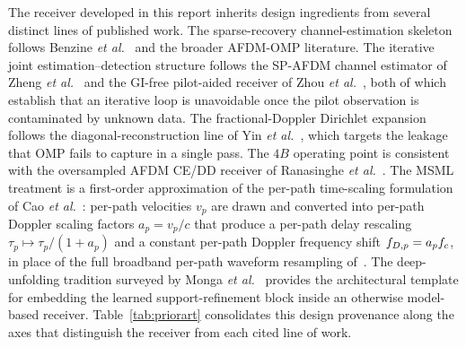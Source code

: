 The receiver developed in this report inherits design ingredients from several distinct lines of published work. The sparse-recovery channel-estimation skeleton follows Benzine \emph{et al.}~\cite{benzine2023sparseafdm} and the broader AFDM-OMP literature. The iterative joint estimation--detection structure follows the SP-AFDM channel estimator of Zheng \emph{et al.}~\cite{qing2024spafdm} and the GI-free pilot-aided receiver of Zhou \emph{et al.}~\cite{zhao2024gifreeafdm}, both of which establish that an iterative loop is unavoidable once the pilot observation is contaminated by unknown data. The fractional-Doppler Dirichlet expansion follows the diagonal-reconstruction line of Yin \emph{et al.}~\cite{yin2024drceafdm}, which targets the leakage that OMP fails to capture in a single pass. The $4B$ operating point is consistent with the oversampled AFDM CE/DD receiver of Ranasinghe \emph{et al.}~\cite{ma2024oversampledafdm}. The MSML treatment is a first-order approximation of the per-path time-scaling formulation of Cao \emph{et al.}~\cite{zhou2024msmlafdm}: per-path velocities $v_p$ are drawn and converted into per-path Doppler scaling factors $a_p = v_p / c$ that produce a per-path delay rescaling $\tau_p \mapsto \tau_p / (1 + a_p)$ and a constant per-path Doppler frequency shift $f_{D,p} = a_p f_c$, in place of the full broadband per-path waveform resampling of~\cite{zhou2024msmlafdm}. The deep-unfolding tradition surveyed by Monga \emph{et al.}~\cite{monga2021unrolling} provides the architectural template for embedding the learned support-refinement block inside an otherwise model-based receiver. Table~\ref{tab:priorart} consolidates this design provenance along the axes that distinguish the receiver from each cited line of work.

